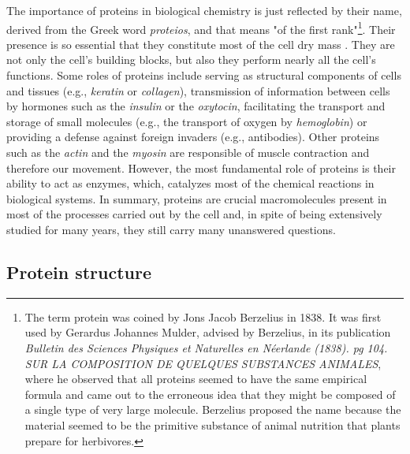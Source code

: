 \documentclass[12pt, a4paper,twoside]{tesi_upf}
\begin{document}
\par The importance of proteins in biological chemistry is just reflected by their name, derived from the Greek word \textit{proteios}, and that means "of the first rank"\footnote{The term protein was coined by Jons Jacob Berzelius in 1838. It was first used by Gerardus Johannes Mulder, advised by Berzelius, in its publication  \textit{Bulletin des Sciences Physiques et Naturelles en N\'eerlande (1838). pg 104. SUR LA COMPOSITION DE QUELQUES SUBSTANCES ANIMALES}, where he observed that all proteins seemed to have the same empirical formula and came out to the erroneous idea that they might be composed of a single type of very large molecule. Berzelius proposed the name because the material seemed to be the primitive substance of animal nutrition that plants prepare for herbivores.}. Their presence is so essential that they  constitute most of the cell dry mass \cite{kessel2010}. They are not only the cell's building blocks, but also they perform nearly all the cell's functions. Some roles of proteins include serving as structural components of cells and tissues (e.g., \textit{keratin} or \textit{collagen}), transmission of information between cells by hormones such as the \textit{insulin} or the \textit{oxytocin}, facilitating the transport and storage of small molecules (e.g., the transport of oxygen by \textit{hemoglobin}) or providing a defense against foreign invaders (e.g., antibodies). Other proteins such as the \textit{actin} and the \textit{myosin} are responsible of muscle contraction and therefore our movement. However, the most fundamental role of proteins is their ability to act as enzymes, which, catalyzes most of the chemical reactions in biological systems. In summary, proteins are crucial macromolecules present in most of the processes carried out by the cell and, in spite of being extensively studied for many years, they still carry many unanswered questions.    

\subsection{Protein structure}
\end{document}
